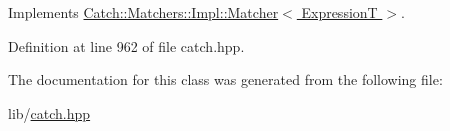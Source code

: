 Implements \hyperlink{struct_catch_1_1_matchers_1_1_impl_1_1_matcher_a091bcc37e589967d7e10fc7790d820e2}{Catch\+::\+Matchers\+::\+Impl\+::\+Matcher$<$ Expression\+T $>$}.



Definition at line 962 of file catch.\+hpp.



The documentation for this class was generated from the following file\+:\begin{DoxyCompactItemize}
\item 
lib/\hyperlink{catch_8hpp}{catch.\+hpp}\end{DoxyCompactItemize}

